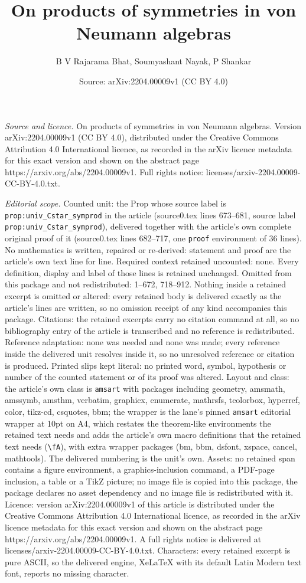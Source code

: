 \documentclass[10pt,a4paper]{amsart}
\title[On products of symmetries in von Neumann algebras]{On products of symmetries in von Neumann algebras}
\author{B V Rajarama Bhat, Soumyashant Nayak, P Shankar}
\date{Source: arXiv:2204.00009v1 (CC BY 4.0)}
\begin{document}
\maketitle

\noindent\emph{Source and licence.} On products of symmetries in von Neumann algebras. Version arXiv:2204.00009v1 (CC BY 4.0), distributed under the Creative Commons Attribution 4.0 International licence, as recorded in the arXiv licence metadata for this exact version and shown on the abstract page https://arxiv.org/abs/2204.00009v1. Full rights notice: licenses/arxiv-2204.00009-CC-BY-4.0.txt.\par\smallskip

\noindent\textit{Editorial scope.} Counted unit: the Prop whose source label is \texttt{prop:univ\_Cstar\_symprod} in the article (source0.tex lines 673--681, source label \texttt{prop:univ\_Cstar\_symprod}), delivered together with the article's own complete original proof of it (source0.tex lines 682--717, one \texttt{proof} environment of 36 lines). No mathematics is written, repaired or re-derived: statement and proof are the article's own text line for line. Required context retained uncounted: none. Every definition, display and label of those lines is retained unchanged. Omitted from this package and not redistributed: 1--672, 718--912. Nothing inside a retained excerpt is omitted or altered: every retained body is delivered exactly as the article's lines are written, so no omission receipt of any kind accompanies this package. Citations: the retained excerpts carry no citation command at all, so no bibliography entry of the article is transcribed and no reference is redistributed. Reference adaptation: none was needed and none was made; every reference inside the delivered unit resolves inside it, so no unresolved reference or citation is produced. Printed slips kept literal: no printed word, symbol, hypothesis or number of the counted statement or of its proof was altered. Layout and class: the article's own class is \texttt{amsart} with packages including geometry, amsmath, amssymb, amsthm, verbatim, graphicx, enumerate, mathrsfs, tcolorbox, hyperref, color, tikz-cd, csquotes, bbm; the wrapper is the lane's pinned \texttt{amsart} editorial wrapper at 10pt on A4, which restates the theorem-like environments the retained text needs and adds the article's own macro definitions that the retained text needs (\texttt{\textbackslash fA}), with extra wrapper packages (bm, bbm, dsfont, xspace, cancel, mathtools). The delivered numbering is the unit's own. Assets: no retained span contains a figure environment, a graphics-inclusion command, a PDF-page inclusion, a table or a TikZ picture; no image file is copied into this package, the package declares no asset dependency and no image file is redistributed with it. Licence: version arXiv:2204.00009v1 of this article is distributed under the Creative Commons Attribution 4.0 International licence, as recorded in the arXiv licence metadata for this exact version and shown on the abstract page https://arxiv.org/abs/2204.00009v1. A full rights notice is delivered at licenses/arxiv-2204.00009-CC-BY-4.0.txt. Characters: every retained excerpt is pure ASCII, so the delivered engine, XeLaTeX with its default Latin Modern text font, reports no missing character.
\end{document}
